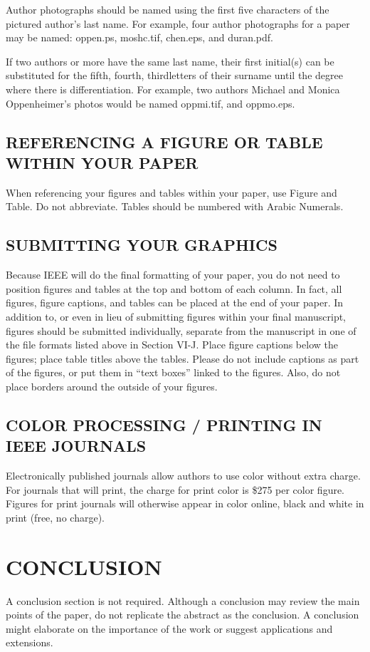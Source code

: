 \documentclass{ieeetj}
\begin{document}
Author photographs should be named using the first five characters of the
pictured author's last name. For example, four author photographs for a
paper may be named: oppen.ps, moshc.tif, chen.eps, and duran.pdf.

If two authors or more have the same last name, their first initial(s) can
be substituted for the fifth, fourth, third\textellipsis letters of their surname
until the degree where there is differentiation. For example, two authors
Michael and Monica Oppenheimer's photos would be named oppmi.tif, and
oppmo.eps.

\subsection{REFERENCING A FIGURE OR TABLE WITHIN YOUR PAPER}
When referencing your figures and tables within your paper, use Figure
and Table. Do not abbreviate. Tables should be numbered with Arabic Numerals.

\subsection{SUBMITTING YOUR GRAPHICS}
Because IEEE will do the final formatting of your paper,
you do not need to position figures and tables at the top and bottom of each
column. In fact, all figures, figure captions, and tables can be placed at
the end of your paper. In addition to, or even in lieu of submitting figures
within your final manuscript, figures should be submitted individually,
separate from the manuscript in one of the file formats listed above in
Section VI-J. Place figure captions below the figures; place table titles
above the tables. Please do not include captions as part of the figures, or
put them in ``text boxes'' linked to the figures. Also, do not place borders
around the outside of your figures.

\subsection{COLOR PROCESSING / PRINTING IN IEEE JOURNALS}
Electronically published journals allow authors to use color without extra charge.
For journals that will print, the charge for print color is \$275 per color figure.
Figures for print journals will otherwise appear in color online, black and white in print (free, no charge).

\section{CONCLUSION}
A conclusion section is not required. Although a conclusion may review the
main points of the paper, do not replicate the abstract as the conclusion. A
conclusion might elaborate on the importance of the work or suggest
applications and extensions.
\end{document}
